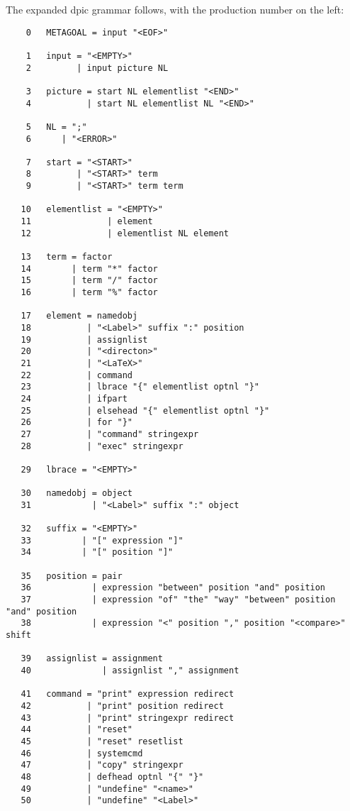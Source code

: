 \documentclass[11pt]{article}
\begin{document}
The expanded dpic grammar follows, with the production number on the left:
\begin{verbatim}
    0   METAGOAL = input "<EOF>" 

    1   input = "<EMPTY>" 
    2         | input picture NL 

    3   picture = start NL elementlist "<END>" 
    4           | start NL elementlist NL "<END>" 

    5   NL = ";" 
    6      | "<ERROR>" 

    7   start = "<START>" 
    8         | "<START>" term 
    9         | "<START>" term term 

   10   elementlist = "<EMPTY>" 
   11               | element 
   12               | elementlist NL element 

   13   term = factor 
   14        | term "*" factor 
   15        | term "/" factor 
   16        | term "%" factor 

   17   element = namedobj 
   18           | "<Label>" suffix ":" position 
   19           | assignlist 
   20           | "<directon>" 
   21           | "<LaTeX>" 
   22           | command 
   23           | lbrace "{" elementlist optnl "}" 
   24           | ifpart 
   25           | elsehead "{" elementlist optnl "}" 
   26           | for "}" 
   27           | "command" stringexpr 
   28           | "exec" stringexpr 

   29   lbrace = "<EMPTY>" 

   30   namedobj = object 
   31            | "<Label>" suffix ":" object 

   32   suffix = "<EMPTY>" 
   33          | "[" expression "]" 
   34          | "[" position "]" 

   35   position = pair 
   36            | expression "between" position "and" position 
   37            | expression "of" "the" "way" "between" position "and" position 
   38            | expression "<" position "," position "<compare>" shift 

   39   assignlist = assignment 
   40              | assignlist "," assignment 

   41   command = "print" expression redirect 
   42           | "print" position redirect 
   43           | "print" stringexpr redirect 
   44           | "reset" 
   45           | "reset" resetlist 
   46           | systemcmd 
   47           | "copy" stringexpr 
   48           | defhead optnl "{" "}" 
   49           | "undefine" "<name>" 
   50           | "undefine" "<Label>" 


\end{verbatim}
\end{document}

